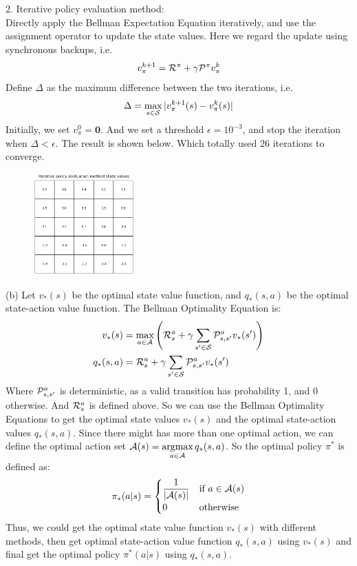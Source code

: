 \begin{homeworkProblem}
2. Iterative policy evaluation method: \\
Directly apply the Bellman Expectation Equation iteratively, and use the assignment operator to update the state values. Here we regard the update using synchronous backups, i.e.
$$v_{\pi}^{k+1} = \mathcal{R}^{\pi} + \gamma \mathcal{P}^{\pi}v_{\pi}^k$$
Define $\Delta$ as the maximum difference between the two iterations, i.e.
$$\Delta = \max_{s \in \mathcal{S}}|v_{\pi}^{k+1}(s) - v_{\pi}^k(s)|$$
Initially, we set $v_{\pi}^0 = \mathbf{0}$. And we set a threshold $\epsilon=10^{-3}$, and stop the iteration when $\Delta < \epsilon$. The result is shown below. Which totally used $26$ iterations to converge.
\begin{figure}[h]
    \centering
    \includegraphics[width=0.35\textwidth]{./figure/p3_output/uniform/iterative_values.png}
\end{figure}

(b) Let $v_*(s)$ be the optimal state value function, and $q_*(s,a)$ be the optimal state-action value function. The Bellman Optimality Equation is:
\begin{align*}
v_*(s) &= \max_{a \in \mathcal{A}}\left(\mathcal{R}_s^a + \gamma \sum_{s' \in \mathcal{S}} \mathcal{P}_{s,s'}^a v_*(s')\right) \\
q_*(s,a) &= \mathcal{R}_s^a + \gamma \sum_{s' \in \mathcal{S}} \mathcal{P}_{s,s'}^a v_*(s')
\end{align*}
Where $\mathcal{P}_{s,s'}^a$ is deterministic, as a valid transition has probability 1, and 0 otherwise. And $\mathcal{R}_s^a$ is defined above. So we can use the Bellman Optimality Equations to get the optimal state values $v_*(s)$ and the optimal state-action values $q_*(s,a)$. Since there might has more than one optimal action, we can define the optimal action set $\mathcal{A}(s)=\mathop{\rm argmax}\limits_{a \in \mathcal{A}} q_*(s,a)$. So the optimal policy $\pi^*$ is defined as:
$$\pi_*(a|s)=\begin{cases}
\dfrac{1}{|\mathcal{A}(s)|} & \text{if } a\in \mathcal{A}(s) \\
0 & \text{otherwise}
\end{cases}$$
Thus, we could get the optimal state value function $v_*(s)$ with different methods, then get optimal state-action value function $q_*(s,a)$ using $v_*(s)$ and final get the optimal policy $\pi^*(a|s)$ using $q_*(s,a)$.


\end{homeworkProblem}
